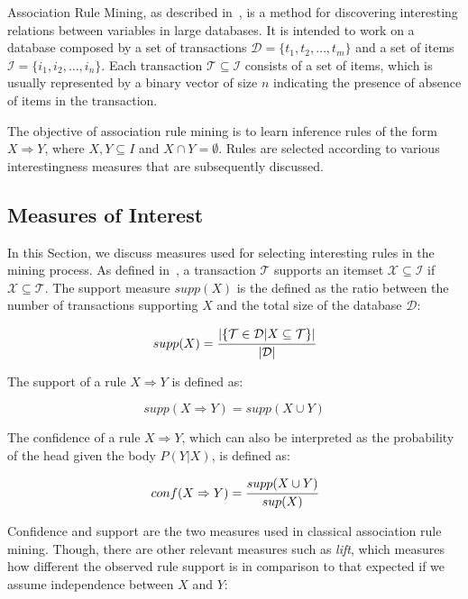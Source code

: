 Association Rule Mining, as described in~\citet{Agrawal:1993:MAR:170036.170072}, is a method for discovering interesting
relations between variables in large databases. It is intended to work on a database composed by a set of transactions
$\mathcal{D}=\{t_1,t_2,\ldots,t_m\}$ and a set of items $\mathcal{I}=\{i_1,i_2,\ldots,i_n\}$. Each transaction
$\mathcal{T} \subseteq \mathcal{I}$ consists of a set of items, which is usually represented by a binary vector of size
$n$ indicating the presence of absence of items in the transaction.

The objective of association rule mining is to learn inference rules of the form $X \Rightarrow Y$, where $X,Y
\subseteq I$ and $X \cap Y = \emptyset$. Rules are selected according to various interestingness measures that are
subsequently discussed.

\subsection{Measures of Interest}

In this Section, we discuss measures used for selecting interesting rules in the mining process. As defined
in~\citet{Agrawal:1993:MAR:170036.170072}, a transaction $\mathcal{T}$ supports an itemset $\mathcal{X} \subseteq
\mathcal{I}$ if $\mathcal{X} \subseteq \mathcal{T}$. The support measure $supp(X)$ is the defined as the ratio between
the number of transactions supporting $X$ and the total size of the database $\mathcal{D}$:

\begin{equation}
 supp(X)=\cfrac{|\{ \mathcal{T} \in \mathcal{D} | X \subseteq \mathcal{T} \}|}{|\mathcal{D}|}
\end{equation}

The support of a rule $X \Rightarrow Y$ is defined as:

\begin{equation}
 supp(X \Rightarrow Y)=supp(X \cup Y)
\end{equation}

The confidence of a rule $X \Rightarrow Y$, which can also be interpreted as the probability of the head given the
body $P(Y|X)$, is defined as:

\begin{equation}
 conf(X \Rightarrow Y)=\cfrac{supp(X \cup Y)}{sup(X)}
\end{equation}

Confidence and support are the two measures used in classical association rule mining. Though, there are other
relevant measures such as \emph{lift}, which measures how different the observed rule support is in comparison to that
expected if we assume independence between $X$ and $Y$:

